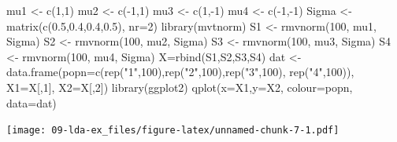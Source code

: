 \documentclass[
]{book}
\newenvironment{Shaded}{\begin{snugshade}}{\end{snugshade}}
\newcommand{\AttributeTok}[1]{\textcolor[rgb]{0.77,0.63,0.00}{#1}}
\newcommand{\DecValTok}[1]{\textcolor[rgb]{0.00,0.00,0.81}{#1}}
\newcommand{\FloatTok}[1]{\textcolor[rgb]{0.00,0.00,0.81}{#1}}
\newcommand{\FunctionTok}[1]{\textcolor[rgb]{0.00,0.00,0.00}{#1}}
\newcommand{\NormalTok}[1]{#1}
\newcommand{\OtherTok}[1]{\textcolor[rgb]{0.56,0.35,0.01}{#1}}
\newcommand{\SpecialCharTok}[1]{\textcolor[rgb]{0.00,0.00,0.00}{#1}}
\newcommand{\StringTok}[1]{\textcolor[rgb]{0.31,0.60,0.02}{#1}}
\theoremstyle{definition}
\theoremstyle{definition}
\theoremstyle{definition}
\theoremstyle{definition}
\theoremstyle{remark}
\begin{document}
\begin{Shaded}
\begin{Highlighting}[]
\NormalTok{mu1 }\OtherTok{\textless{}{-}} \FunctionTok{c}\NormalTok{(}\DecValTok{1}\NormalTok{,}\DecValTok{1}\NormalTok{)}
\NormalTok{mu2 }\OtherTok{\textless{}{-}} \FunctionTok{c}\NormalTok{(}\SpecialCharTok{{-}}\DecValTok{1}\NormalTok{,}\DecValTok{1}\NormalTok{)}
\NormalTok{mu3 }\OtherTok{\textless{}{-}} \FunctionTok{c}\NormalTok{(}\DecValTok{1}\NormalTok{,}\SpecialCharTok{{-}}\DecValTok{1}\NormalTok{)}
\NormalTok{mu4 }\OtherTok{\textless{}{-}} \FunctionTok{c}\NormalTok{(}\SpecialCharTok{{-}}\DecValTok{1}\NormalTok{,}\SpecialCharTok{{-}}\DecValTok{1}\NormalTok{)}
\NormalTok{Sigma }\OtherTok{\textless{}{-}} \FunctionTok{matrix}\NormalTok{(}\FunctionTok{c}\NormalTok{(}\FloatTok{0.5}\NormalTok{,}\FloatTok{0.4}\NormalTok{,}\FloatTok{0.4}\NormalTok{,}\FloatTok{0.5}\NormalTok{), }\AttributeTok{nr=}\DecValTok{2}\NormalTok{)}
\FunctionTok{library}\NormalTok{(mvtnorm)}
\NormalTok{S1 }\OtherTok{\textless{}{-}} \FunctionTok{rmvnorm}\NormalTok{(}\DecValTok{100}\NormalTok{, mu1, Sigma)}
\NormalTok{S2 }\OtherTok{\textless{}{-}} \FunctionTok{rmvnorm}\NormalTok{(}\DecValTok{100}\NormalTok{, mu2, Sigma)}
\NormalTok{S3 }\OtherTok{\textless{}{-}} \FunctionTok{rmvnorm}\NormalTok{(}\DecValTok{100}\NormalTok{, mu3, Sigma)}
\NormalTok{S4 }\OtherTok{\textless{}{-}} \FunctionTok{rmvnorm}\NormalTok{(}\DecValTok{100}\NormalTok{, mu4, Sigma)}
\NormalTok{X}\OtherTok{=}\FunctionTok{rbind}\NormalTok{(S1,S2,S3,S4)}
\NormalTok{dat }\OtherTok{\textless{}{-}} \FunctionTok{data.frame}\NormalTok{(}\AttributeTok{popn=}\FunctionTok{c}\NormalTok{(}\FunctionTok{rep}\NormalTok{(}\StringTok{"1"}\NormalTok{,}\DecValTok{100}\NormalTok{),}\FunctionTok{rep}\NormalTok{(}\StringTok{"2"}\NormalTok{,}\DecValTok{100}\NormalTok{),}\FunctionTok{rep}\NormalTok{(}\StringTok{"3"}\NormalTok{,}\DecValTok{100}\NormalTok{),}
                         \FunctionTok{rep}\NormalTok{(}\StringTok{"4"}\NormalTok{,}\DecValTok{100}\NormalTok{)), }\AttributeTok{X1=}\NormalTok{X[,}\DecValTok{1}\NormalTok{], }\AttributeTok{X2=}\NormalTok{X[,}\DecValTok{2}\NormalTok{])}
\FunctionTok{library}\NormalTok{(ggplot2)}
\FunctionTok{qplot}\NormalTok{(}\AttributeTok{x=}\NormalTok{X1,}\AttributeTok{y=}\NormalTok{X2, }\AttributeTok{colour=}\NormalTok{popn, }\AttributeTok{data=}\NormalTok{dat)}
\end{Highlighting}
\end{Shaded}

\texttt{[image: 09-lda-ex\_files/figure-latex/unnamed-chunk-7-1.pdf]}
\end{document}
